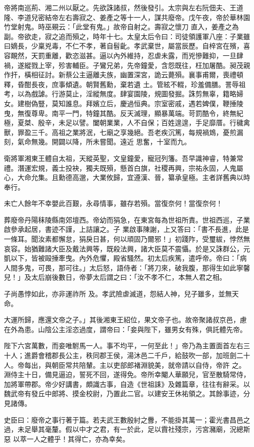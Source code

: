 \begin{pinyinscope}
 帝將南巡荊、湘二州以厭之。先欲誅諸叔，然後發引。太宗與左右阮佃夫、王道隆、李道兒密結帝左右壽寂之、姜產之等十一人，謀共廢帝。戊午夜，帝於華林園竹堂射鬼。時巫覡云：「此堂有鬼。」故帝自射之。壽寂之懷刀
 直入，姜產之為副。帝欲走，寂之追而殞之，時年十七。太皇太后令曰：司徒領護軍八座：子業雖曰嫡長，少稟兇毒，不仁不孝，著自髫齔。孝武棄世，屬當辰歷。自梓宮在殯，喜容靦然，天罰重離，歡恣滋甚。逼以內外維持，忍虐未露，而兇慘難抑，一旦肆禍，遂縱戮上宰，殄害輔臣。子鸞兄弟，先帝鐘愛，含怨既往，枉加屠酷。昶茂親作扞，橫相征討。新蔡公主逼離夫族，幽置深宮，詭云薨殞。襄事甫爾，喪禮頓釋，昏酣長夜，庶事傾遺。朝賢舊勳，棄若遺
 土。管絃不輟，珍羞備膳。詈辱祖考，以為戲謔。行游莫止，淫縱無度。肆宴園陵，規圖發掘。誅剪無辜，籍略婦女。建樹偽豎，莫知誰息。拜嬪立后，慶過恒典。宗室密戚，遇若婢僕，鞭捶陵曳，無復尊卑。南平一門，特鐘其酷。反天滅理，顯暴萬端。苛罰酷令，終無紀極，夏桀、殷辛，未足以譬。闔朝業業，人不自保；百姓遑遑，手足靡厝。行穢禽獸，罪盈三千。高祖之業將泯，七廟之享幾絕。吾老疾沉篤，每規禍鴆，憂煎漏刻，氣命無幾。開闢以降，所未嘗聞。遠近
 思奮，十室而九。



 衛將軍湘東王體自太祖，天縱英聖，文皇鐘愛，寵冠列籓。吾早識神睿，特兼常禮。潛運宏規，義士投袂，獨夫既殞，懸首白旗，社稷再興，宗祐永固，人鬼屬心，大命允集。且勳德高邈，大業攸歸，宜遵漢、晉，纂承皇極。主者詳舊典以時奉行。



 未亡人餘年不幸嬰此百艱，永尋情事，雖存若殞。當復奈何！當復奈何！



 葬廢帝丹陽秣陵縣南郊壇西。帝幼而狷急，在東宮每為世祖所責。世祖西巡，子業啟參承起居，書迹不謹，上詰讓之。子
 業啟事陳謝，上又答曰：「書不長進，此是一條耳。聞汝素都懈怠，狷戾日甚，何以頑固乃爾邪！」初踐阼，受璽紱，悖然無哀容。始猶難諸大臣及戴法興等，既殺法興，諸大臣莫不震懾。於是又誅群公，元凱以下，皆被毆捶牽曳。內外危懼，殿省騷然。初太后疾篤，遣呼帝。帝曰：「病人間多鬼，可畏，那可往。」太后怒，語侍者：「將刀來，破我腹，那得生如此寧馨兒！」及太后崩後數日，帝夢太后謂之曰：「汝不孝不仁，本無人君之相。



 子尚愚悖如此，亦非運祚所
 及。孝武險虐滅道，怨結人神，兒子雖多，並無天命。



 大運所歸，應還文帝之子。」其後湘東王紹位，果文帝子也。故帝聚諸叔京邑，慮在外為患。山陰公主淫恣過度，謂帝曰：「妾與陛下，雖男女有殊，俱託體先帝。



 陛下六宮萬數，而妾唯駙馬一人。事不均平，一何至此！」帝乃為主置面首左右三十人；進爵會稽郡長公主，秩同郡王侯，湯沐邑二千戶，給鼓吹一部，加班劍二十人。帝每出，與朝臣常共陪輦。主以吏部郎褚淵貌美，就帝請以自侍，帝許
 之。淵侍主十日，備見逼迫，誓死不回，遂得免。帝所幸閹人華願兒，官至散騎常侍，加將軍帶郡。帝少好講書，頗識古事，自造《世祖誄》及雜篇章，往往有辭采。以魏武帝有發丘中郎將、摸金校尉，乃置此二官。以建安王休祐領之。其餘事迹，分見諸傳。



 史臣曰：廢帝之事行著于篇。若夫武王數殷紂之釁，不能掛其萬一；霍光書昌邑之過，未足舉其毫釐。假以中才之君，有一於此，足以霣社殘宗，污宮瀦廟，況總斯惡
 以萃一人之體乎！其得亡，亦為幸矣。



\end{pinyinscope}